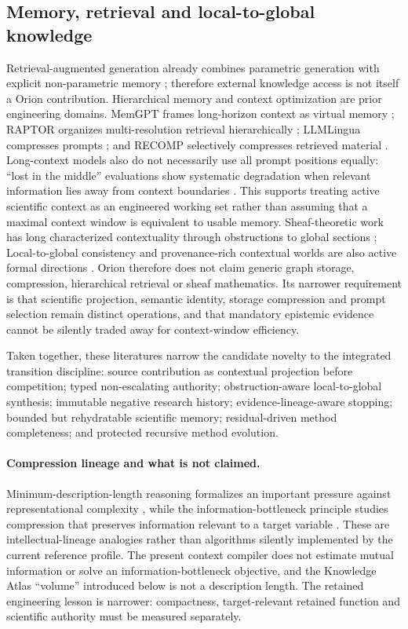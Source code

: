 \subsection{Memory, retrieval and local-to-global knowledge}
Retrieval-augmented generation already combines parametric generation with explicit non-parametric memory \cite{lewis2020}; therefore external knowledge access is not itself a Orion contribution. Hierarchical memory and context optimization are prior engineering domains. MemGPT frames long-horizon context as virtual memory \cite{packer2023}; RAPTOR organizes multi-resolution retrieval hierarchically \cite{sarthi2024}; LLMLingua compresses prompts \cite{jiang2023}; and RECOMP selectively compresses retrieved material \cite{xu2023}. Long-context models also do not necessarily use all prompt positions equally: ``lost in the middle'' evaluations show systematic degradation when relevant information lies away from context boundaries \cite{liu2024}. This supports treating active scientific context as an engineered working set rather than assuming that a maximal context window is equivalent to usable memory. Sheaf-theoretic work has long characterized contextuality through obstructions to global sections \cite{abramsky2011}; Local-to-global consistency and provenance-rich contextual worlds are also active formal directions \cite{gibson2026,vitali2026}. Orion therefore does not claim generic graph storage, compression, hierarchical retrieval or sheaf mathematics. Its narrower requirement is that scientific projection, semantic identity, storage compression and prompt selection remain distinct operations, and that mandatory epistemic evidence cannot be silently traded away for context-window efficiency.

Taken together, these literatures narrow the candidate novelty to the integrated transition discipline: source contribution as contextual projection before competition; typed non-escalating authority; obstruction-aware local-to-global synthesis; immutable negative research history; evidence-lineage-aware stopping; bounded but rehydratable scientific memory; residual-driven method completeness; and protected recursive method evolution.

\paragraph{Compression lineage and what is not claimed.}
Minimum-description-length reasoning formalizes an important pressure against representational complexity \cite{rissanen1978}, while the information-bottleneck principle studies compression that preserves information relevant to a target variable \cite{tishby2000}. These are intellectual-lineage analogies rather than algorithms silently implemented by the current reference profile. The present context compiler does not estimate mutual information or solve an information-bottleneck objective, and the Knowledge Atlas ``volume'' introduced below is not a description length. The retained engineering lesson is narrower: compactness, target-relevant retained function and scientific authority must be measured separately.
